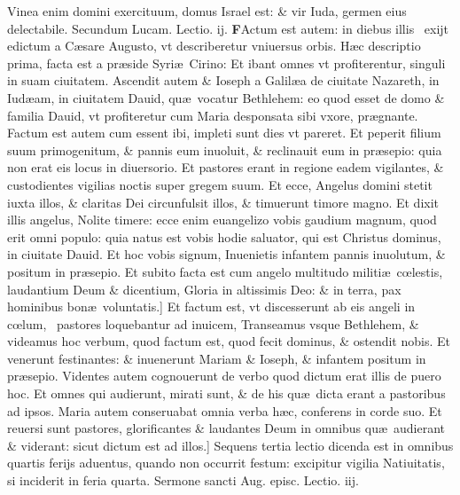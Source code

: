 \documentclass[a5paper,10pt]{book}
\def\ae{æ}
\def\oe{œ}
\begin{document}
\begin{multicols*}{2}
Vinea enim domini exercituum, domus Israel est: \& vir Iuda, germen eius delectabile.
\newline \color{red} Secundum Lucam. \hfill Lectio. ij.\color{black}
\vspace{-.25em}
\lettrine[lines=2]{\bfseries \color{red} F}{}Actum est autem: in diebus illis \textdagger \ exijt edictum a C\ae sare Augusto, vt describeretur vniuersus orbis.
H\ae c descriptio prima, facta est a pr\ae side Syri\ae \ Cirino: Et ibant omnes vt profiterentur, singuli in suam ciuitatem.
Ascendit autem \& Ioseph a Galil\ae a de ciuitate Nazareth, in Iud\ae am, in ciuitatem Dauid, qu\ae \ vocatur Bethlehem: eo quod esset de domo \& familia Dauid, vt profiteretur cum Maria desponsata sibi vxore, pr\ae gnante.
Factum est autem cum essent ibi, impleti sunt dies vt pareret.
Et peperit filium suum primogenitum, \& pannis eum inuoluit, \& reclinauit eum in pr\ae sepio: quia non erat eis locus in diuersorio. Et pastores erant in regione eadem vigilantes, \& custodientes vigilias noctis super gregem suum.
Et ecce, Angelus domini stetit iuxta illos, \& claritas Dei circunfulsit illos, \& timuerunt timore magno.
Et dixit illis angelus, Nolite timere: ecce enim euangelizo vobis gaudium magnum, quod erit omni populo: quia natus est vobis hodie saluator, qui est Christus dominus, in ciuitate Dauid.
Et hoc vobis signum, Inuenietis infantem pannis inuolutum, \& positum in pr\ae sepio.
Et subito facta est cum angelo multitudo militi\ae \ c\oe lestis, laudantium Deum \& dicentium, Gloria in altissimis Deo: \& in terra, pax hominibus bon\ae \ voluntatis.]
Et factum est, vt discesserunt ab eis angeli in c\oe lum, \textdagger \ pastores loquebantur ad inuicem, Transeamus vsque Bethlehem, \& videamus hoc verbum, quod factum est, quod fecit dominus, \& ostendit nobis.
Et venerunt festinantes: \& inuenerunt Mariam \& Ioseph, \& infantem positum in pr\ae sepio.
Videntes autem cognouerunt de verbo quod dictum erat illis de puero hoc.
Et omnes qui audierunt, mirati sunt, \& de his qu\ae \ dicta erant a pastoribus ad ipsos.
Maria autem conseruabat omnia verba h\ae c, conferens in corde suo.
Et reuersi sunt pastores, glorificantes \& laudantes Deum in omnibus qu\ae \ audierant \& viderant: sicut dictum est ad illos.]
\newline {} \color{red} Sequens tertia lectio dicenda est in omnibus quartis ferijs aduentus, quando non occurrit festum: excipitur vigilia Natiuitatis, si inciderit in feria quarta. \color{black}
\newline \color{red} Sermone sancti Aug. episc. Lectio. iij. \color{black}

\end{multicols*}
\end{document}
